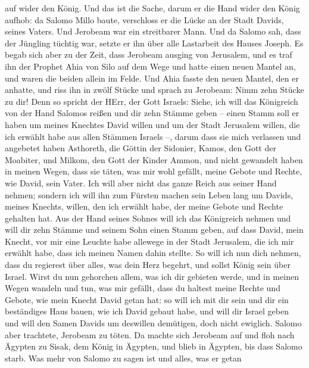 auf wider den König.  Und das ist die Sache, darum er die
Hand wider den König aufhob: da Salomo Millo baute, verschloss er die
Lücke an der Stadt Davids, seines Vaters.  Und Jerobeam war
ein streitbarer Mann. Und da Salomo sah, dass der Jüngling tüchtig war,
setzte er ihn über alle Lastarbeit des Hauses Joseph.  Es
begab sich aber zu der Zeit, dass Jerobeam ausging von Jerusalem, und es
traf ihn der Prophet Ahia von Silo auf dem Wege und hatte einen neuen
Mantel an, und waren die beiden allein im Felde.  Und Ahia
fasste den neuen Mantel, den er anhatte, und riss ihn in zwölf Stücke
 und sprach zu Jerobeam: Nimm zehn Stücke zu dir! Denn so
spricht der HErr, der Gott Israels: Siehe, ich will das Königreich von
der Hand Salomos reißen und dir zehn Stämme geben --  einen
Stamm soll er haben um meines Knechtes David willen und um der Stadt
Jerusalem willen, die ich erwählt habe aus allen Stämmen Israels --,
 darum dass sie mich verlassen und angebetet haben
Asthoreth, die Göttin der Sidonier, Kamos, den Gott der Moabiter, und
Milkom, den Gott der Kinder Ammon, und nicht gewandelt haben in meinen
Wegen, dass sie täten, was mir wohl gefällt, meine Gebote und Rechte,
wie David, sein Vater.  Ich will aber nicht das ganze Reich
aus seiner Hand nehmen; sondern ich will ihn zum Fürsten machen sein
Leben lang um Davids, meines Knechts, willen, den ich erwählt habe, der
meine Gebote und Rechte gehalten hat.  Aus der Hand seines
Sohnes will ich das Königreich nehmen und will dir zehn Stämme
 und seinem Sohn einen Stamm geben, auf dass David, mein
Knecht, vor mir eine Leuchte habe allewege in der Stadt Jerusalem, die
ich mir erwählt habe, dass ich meinen Namen dahin stellte. 
So will ich nun dich nehmen, dass du regierest über alles, was dein Herz
begehrt, und sollst König sein über Israel.  Wirst du nun
gehorchen allem, was ich dir gebieten werde, und in meinen Wegen wandeln
und tun, was mir gefällt, dass du haltest meine Rechte und Gebote, wie
mein Knecht David getan hat: so will ich mit dir sein und dir ein
beständiges Haus bauen, wie ich David gebaut habe, und will dir Israel
geben  und will den Samen Davids um deswillen demütigen,
doch nicht ewiglich.  Salomo aber trachtete, Jerobeam zu
töten. Da machte sich Jerobeam auf und floh nach Ägypten zu Sisak, dem
König in Ägypten, und blieb in Ägypten, bis dass Salomo starb.
 Was mehr von Salomo zu sagen ist und alles, was er getan
